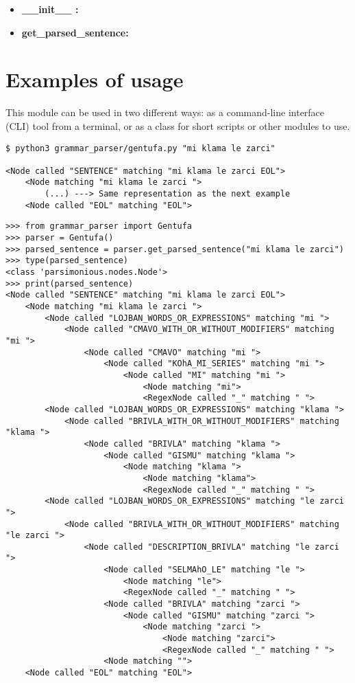 \begin{itemize}
\item \textbf{\_\_init\_\_ :}
\item \textbf{get\_parsed\_sentence:}
\end{itemize}

\section{Examples of usage}

This module can be used in two different ways: as a command-line interface (CLI) tool
from a terminal, or as a class for short scripts or other modules to use.

\begin{lstlisting}[caption=Gentufa module being used as a command-line interface tool]
$ python3 grammar_parser/gentufa.py "mi klama le zarci"

<Node called "SENTENCE" matching "mi klama le zarci EOL">
    <Node matching "mi klama le zarci ">
        (...) ---> Same representation as the next example
    <Node called "EOL" matching "EOL">
\end{lstlisting}

\begin{lstlisting}[caption=Gentufa class being used by a Python script]
>>> from grammar_parser import Gentufa
>>> parser = Gentufa()
>>> parsed_sentence = parser.get_parsed_sentence("mi klama le zarci")
>>> type(parsed_sentence)
<class 'parsimonious.nodes.Node'>
>>> print(parsed_sentence)
<Node called "SENTENCE" matching "mi klama le zarci EOL">
    <Node matching "mi klama le zarci ">
        <Node called "LOJBAN_WORDS_OR_EXPRESSIONS" matching "mi ">
            <Node called "CMAVO_WITH_OR_WITHOUT_MODIFIERS" matching "mi ">
                <Node called "CMAVO" matching "mi ">
                    <Node called "KOhA_MI_SERIES" matching "mi ">
                        <Node called "MI" matching "mi ">
                            <Node matching "mi">
                            <RegexNode called "_" matching " ">
        <Node called "LOJBAN_WORDS_OR_EXPRESSIONS" matching "klama ">
            <Node called "BRIVLA_WITH_OR_WITHOUT_MODIFIERS" matching "klama ">
                <Node called "BRIVLA" matching "klama ">
                    <Node called "GISMU" matching "klama ">
                        <Node matching "klama ">
                            <Node matching "klama">
                            <RegexNode called "_" matching " ">
        <Node called "LOJBAN_WORDS_OR_EXPRESSIONS" matching "le zarci ">
            <Node called "BRIVLA_WITH_OR_WITHOUT_MODIFIERS" matching "le zarci ">
                <Node called "DESCRIPTION_BRIVLA" matching "le zarci ">
                    <Node called "SELMAhO_LE" matching "le ">
                        <Node matching "le">
                        <RegexNode called "_" matching " ">
                    <Node called "BRIVLA" matching "zarci ">
                        <Node called "GISMU" matching "zarci ">
                            <Node matching "zarci ">
                                <Node matching "zarci">
                                <RegexNode called "_" matching " ">
                    <Node matching "">
    <Node called "EOL" matching "EOL">
\end{lstlisting}